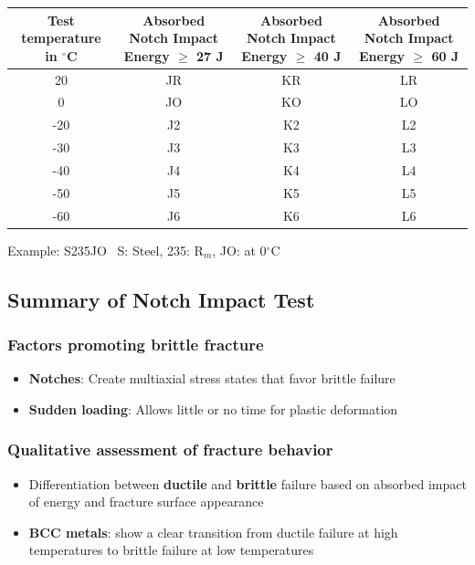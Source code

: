 \documentclass{article}
\begin{document}
\begin{table}[h!]
  \centering
  \renewcommand{\arraystretch}{1.3}
  \begin{tabular}{|c|c|c|c|}
    \hline
    \makecell{\textbf{Test temperature}\\\textbf{in $^\circ$C}} &
    \makecell{\textbf{Absorbed Notch}\\\textbf{Impact Energy $\geq$ 27 J}} &
    \makecell{\textbf{Absorbed Notch}\\\textbf{Impact Energy $\geq$ 40 J}} &
    \makecell{\textbf{Absorbed Notch}\\\textbf{Impact Energy $\geq$ 60 J}}\\
    \hline
    20 & JR & KR & LR \\
    \hline
    0 & JO & KO & LO \\
    \hline
    -20 & J2 & K2 & L2 \\
    \hline
    -30 & J3 & K3 & L3 \\
    \hline
    -40 & J4 & K4 & L4 \\
    \hline
    -50 & J5 & K5 & L5 \\
    \hline
    -60 & J6 & K6 & L6 \\
    \hline
  \end{tabular}
\end{table}

Example: S235JO \textrightarrow\ S: Steel, 235: R$_m$, JO: at 0$^\circ$C

\subsection{Summary of Notch Impact Test}
\subsubsection{Factors promoting brittle fracture}
\begin{itemize}
  \item \textbf{Notches}: Create multiaxial stress states that favor brittle failure
  \item \textbf{Sudden loading}: Allows little or no time for plastic deformation 
\end{itemize}

\subsubsection{Qualitative assessment of fracture behavior}
\begin{itemize}
  \item Differentiation between \textbf{ductile} and \textbf{brittle} failure based on absorbed impact of energy and fracture surface appearance
  \item \textbf{BCC metals}: show a clear transition from ductile failure at high temperatures to brittle failure at low temperatures
\end{itemize}
\end{document}
